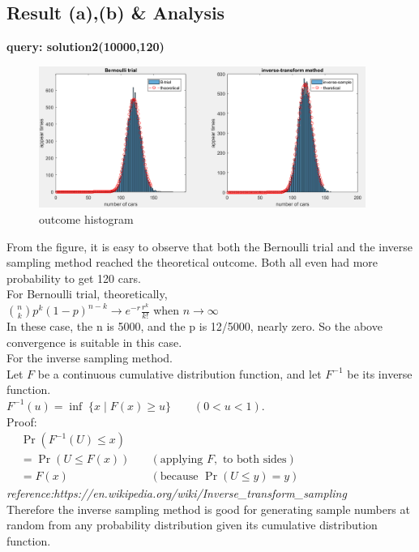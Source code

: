 \documentclass[twoside]{article}
\begin{document}
\subsection{\normalsize{Result (a),(b) \& Analysis}}
\noindent \textbf {query: solution2(10000,120)}
\begin{figure}[H]%
   \centering
   \includegraphics[width = 0.95\textwidth]{../data/solution2.png}  
   \caption{outcome histogram}
\end{figure}
\noindent From the figure, it is easy to observe that both the Bernoulli trial and the inverse sampling method reached the theoretical outcome. Both all even had more probability to get 120 cars. \\
For Bernoulli trial, theoretically, \\
$\binom{n}{k}p^k(1-p)^{n-k} \rightarrow e^{-r}\frac{r^k}{k!} $ when $n \rightarrow \infty$\\
In these case, the n is 5000, and the p is 12/5000, nearly zero. So the above convergence is suitable in this case.\\
For the inverse sampling method.\\
Let $F$ be a continuous cumulative distribution function, and let $F^{-1}$ be its inverse function.\\
$\displaystyle F^{-1}(u)=\inf \;\{x\mid F(x)\geq u\}\qquad (0<u<1).$ \\
Proof:\\
${\displaystyle {\begin{aligned}&\Pr(F^{-1}(U)\leq x)\\&{}=\Pr(U\leq F(x))\quad &({\text{applying }}F,{\text{ to both sides}})\\&{}=F(x)\quad &({\text{because }}\Pr(U\leq y)=y)\end{aligned}}}$ \\
\emph{reference:https://en.wikipedia.org/wiki/Inverse\_transform\_sampling}\\
Therefore the inverse sampling method is good for generating sample numbers at random from any probability distribution given its cumulative distribution function.\\
\end{document}
